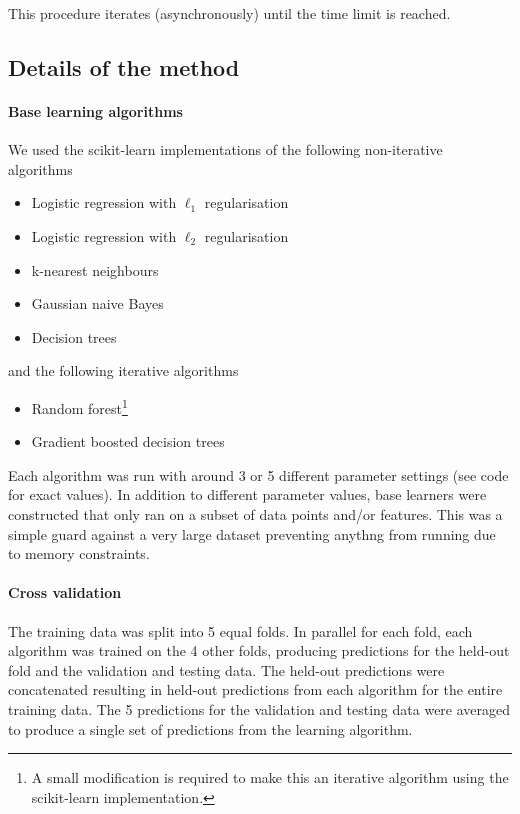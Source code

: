 \documentclass{article} %
\begin{document}
This procedure iterates (asynchronously) until the time limit is reached.

\subsection{Details of the method}

\paragraph{Base learning algorithms}

We used the scikit-learn implementations of the following non-iterative\footnotemark{} algorithms
\begin{itemize}
  \item Logistic regression with $\ell_1$ regularisation
  \item Logistic regression with $\ell_2$ regularisation
  \item k-nearest neighbours
  \item Gaussian naive Bayes
  \item Decision trees
\end{itemize}
and the following iterative algorithms
\begin{itemize}
  \item Random forest\footnote{A small modification is required to make this an iterative algorithm using the scikit-learn implementation.}
  \item Gradient boosted decision trees
\end{itemize}
Each algorithm was run with around 3 or 5 different parameter settings (see code for exact values).
In addition to different parameter values, base learners were constructed that only ran on a subset of data points and/or features.
This was a simple guard against a very large dataset preventing anythng from running due to memory constraints.

\paragraph{Cross validation}

The training data was split into 5 equal folds.
In parallel for each fold, each algorithm was trained on the 4 other folds, producing predictions for the held-out fold and the validation and testing data.
The held-out predictions were concatenated resulting in held-out predictions from each algorithm for the entire training data.
The 5 predictions for the validation and testing data were averaged to produce a single set of predictions from the learning algorithm.
\end{document}
